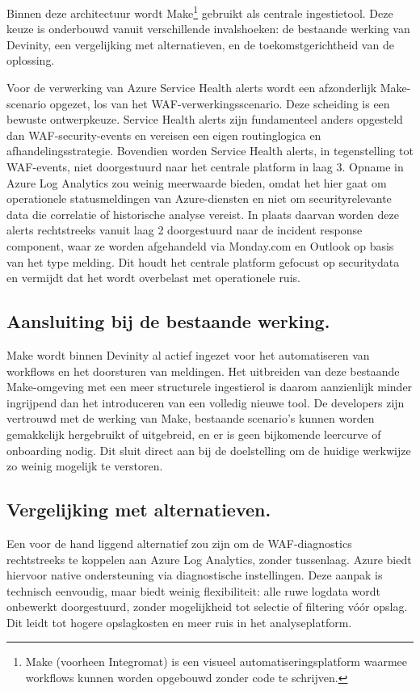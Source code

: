 Binnen deze architectuur wordt Make\footnote{Make (voorheen Integromat) is een visueel automatiseringsplatform waarmee workflows kunnen worden opgebouwd zonder code te schrijven.} gebruikt als centrale ingestietool. Deze keuze is onderbouwd vanuit verschillende invalshoeken: de bestaande werking van Devinity, een vergelijking met alternatieven, en de toekomstgerichtheid van de oplossing.

Voor de verwerking van Azure Service Health alerts wordt een afzonderlijk Make-scenario opgezet, los van het WAF-verwerkingsscenario. Deze scheiding is een bewuste ontwerpkeuze. Service Health alerts zijn fundamenteel anders opgesteld dan WAF-security-events en vereisen een eigen routinglogica en afhandelingsstrategie. Bovendien worden Service Health alerts, in tegenstelling tot WAF-events, niet doorgestuurd naar het centrale platform in laag 3. Opname in Azure Log Analytics zou weinig meerwaarde bieden, omdat het hier gaat om operationele statusmeldingen van Azure-diensten en niet om securityrelevante data die correlatie of historische analyse vereist. In plaats daarvan worden deze alerts rechtstreeks vanuit laag 2 doorgestuurd naar de incident response component, waar ze worden afgehandeld via Monday.com en Outlook op basis van het type melding. Dit houdt het centrale platform gefocust op securitydata en vermijdt dat het wordt overbelast met operationele ruis.

\subsection{Aansluiting bij de bestaande werking.}
Make wordt binnen Devinity al actief ingezet voor het automatiseren van workflows en het doorsturen van meldingen. Het uitbreiden van deze bestaande Make-omgeving met een meer structurele ingestierol is daarom aanzienlijk minder ingrijpend dan het introduceren van een volledig nieuwe tool. De developers zijn vertrouwd met de werking van Make, bestaande scenario's kunnen worden gemakkelijk hergebruikt of uitgebreid, en er is geen bijkomende leercurve of onboarding nodig. Dit sluit direct aan bij de doelstelling om de huidige werkwijze zo weinig mogelijk te verstoren.

\subsection{Vergelijking met alternatieven.}
Een voor de hand liggend alternatief zou zijn om de WAF-diagnostics rechtstreeks te koppelen aan Azure Log Analytics, zonder tussenlaag. Azure biedt hiervoor native ondersteuning via diagnostische instellingen. Deze aanpak is technisch eenvoudig, maar biedt weinig flexibiliteit: alle ruwe logdata wordt onbewerkt doorgestuurd, zonder mogelijkheid tot selectie of filtering vóór opslag. Dit leidt tot hogere opslagkosten en meer ruis in het analyseplatform.

